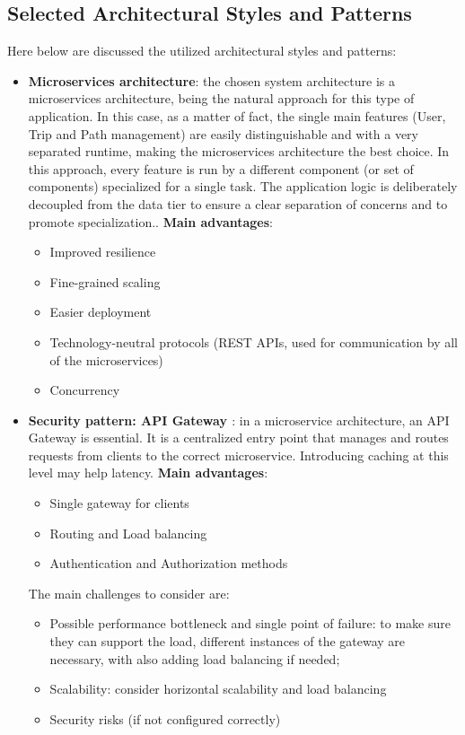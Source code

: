 \subsection{Selected Architectural Styles and Patterns}
Here below are discussed the utilized architectural styles and patterns:
\begin{itemize}
    \item \textbf{Microservices architecture}: the chosen system architecture is a microservices architecture, being the natural approach for this type of application. In this case, as a matter of fact, the single main features (User, Trip and Path management) are easily distinguishable and with a very separated runtime, making the microservices architecture the best choice. In this approach, every feature is run by a different component (or set of components) specialized for a single task. The application logic is deliberately decoupled from the data tier to ensure a clear separation of concerns and to promote specialization.. \newline
            \textbf{Main advantages}:
            \begin{itemize}[label = -]
                \item Improved resilience
                \item Fine-grained scaling
                \item Easier deployment
                \item Technology-neutral protocols (REST APIs, used for communication by all of the microservices)
                \item Concurrency
            \end{itemize}

    \item \textbf{Security pattern: API Gateway \cite{apigateway}}: in a microservice architecture, an API Gateway is essential. It is a centralized entry point that manages and routes requests from clients to the correct microservice. Introducing caching at this level may help latency.
    \newline
    \textbf{Main advantages}:
            \begin{itemize}[label = -]
                \item Single gateway for clients
                \item Routing and Load balancing
                \item Authentication and Authorization methods
            \end{itemize}
    The main challenges to consider are:
    \begin{itemize}[label = -]
                \item Possible performance bottleneck and single point of failure: to make sure they can support the load, different instances of the gateway are necessary, with also adding load balancing if needed;
                \item Scalability: consider horizontal scalability and load balancing
                \item Security risks (if not configured correctly)
            \end{itemize}
            

\end{itemize}
